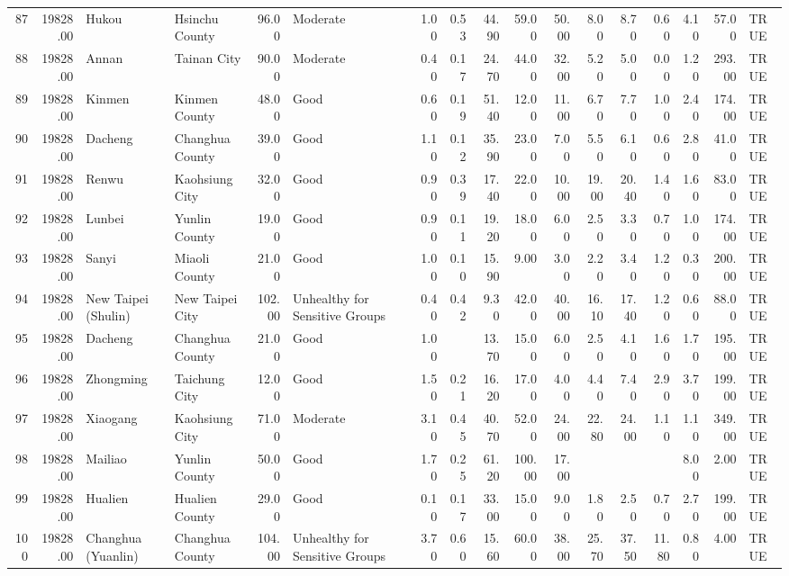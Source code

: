 \begin{table}[ht]
\begin{tabular}{rrllrlrrrrrrrrrrl}
  87 & 19828.00 & Hukou & Hsinchu County & 96.00 & Moderate & 1.00 & 0.53 & 44.90 & 59.00 & 50.00 & 8.00 & 8.70 & 0.60 & 4.10 & 57.00 & TRUE \\ 
  88 & 19828.00 & Annan & Tainan City & 90.00 & Moderate & 0.40 & 0.17 & 24.70 & 44.00 & 32.00 & 5.20 & 5.00 & 0.00 & 1.20 & 293.00 & TRUE \\ 
  89 & 19828.00 & Kinmen & Kinmen County & 48.00 & Good & 0.60 & 0.19 & 51.40 & 12.00 & 11.00 & 6.70 & 7.70 & 1.00 & 2.40 & 174.00 & TRUE \\ 
  90 & 19828.00 & Dacheng & Changhua County & 39.00 & Good & 1.10 & 0.12 & 35.90 & 23.00 & 7.00 & 5.50 & 6.10 & 0.60 & 2.80 & 41.00 & TRUE \\ 
  91 & 19828.00 & Renwu & Kaohsiung City & 32.00 & Good & 0.90 & 0.39 & 17.40 & 22.00 & 10.00 & 19.00 & 20.40 & 1.40 & 1.60 & 83.00 & TRUE \\ 
  92 & 19828.00 & Lunbei & Yunlin County & 19.00 & Good & 0.90 & 0.11 & 19.20 & 18.00 & 6.00 & 2.50 & 3.30 & 0.70 & 1.00 & 174.00 & TRUE \\ 
  93 & 19828.00 & Sanyi & Miaoli County & 21.00 & Good & 1.00 & 0.10 & 15.90 & 9.00 & 3.00 & 2.20 & 3.40 & 1.20 & 0.30 & 200.00 & TRUE \\ 
  94 & 19828.00 & New Taipei (Shulin) & New Taipei City & 102.00 & Unhealthy for Sensitive Groups & 0.40 & 0.42 & 9.30 & 42.00 & 40.00 & 16.10 & 17.40 & 1.20 & 0.60 & 88.00 & TRUE \\ 
  95 & 19828.00 & Dacheng & Changhua County & 21.00 & Good & 1.00 &  & 13.70 & 15.00 & 6.00 & 2.50 & 4.10 & 1.60 & 1.70 & 195.00 & TRUE \\ 
  96 & 19828.00 & Zhongming & Taichung City & 12.00 & Good & 1.50 & 0.21 & 16.20 & 17.00 & 4.00 & 4.40 & 7.40 & 2.90 & 3.70 & 199.00 & TRUE \\ 
  97 & 19828.00 & Xiaogang & Kaohsiung City & 71.00 & Moderate & 3.10 & 0.45 & 40.70 & 52.00 & 24.00 & 22.80 & 24.00 & 1.10 & 1.10 & 349.00 & TRUE \\ 
  98 & 19828.00 & Mailiao & Yunlin County & 50.00 & Good & 1.70 & 0.25 & 61.20 & 100.00 & 17.00 &  &  &  & 8.00 & 2.00 & TRUE \\ 
  99 & 19828.00 & Hualien & Hualien County & 29.00 & Good & 0.10 & 0.17 & 33.00 & 15.00 & 9.00 & 1.80 & 2.50 & 0.70 & 2.70 & 199.00 & TRUE \\ 
  100 & 19828.00 & Changhua (Yuanlin) & Changhua County & 104.00 & Unhealthy for Sensitive Groups & 3.70 & 0.60 & 15.60 & 60.00 & 38.00 & 25.70 & 37.50 & 11.80 & 0.80 & 4.00 & TRUE \\ 

\end{tabular}
\end{table}
